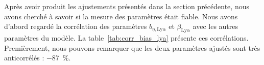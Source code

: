 Après avoir produit les ajustements présentés dans la section précédente, nous avons cherché à savoir si la mesure des paramètres \lya{} était fiable. Nous avons d'abord regardé la corrélation des paramètres $b_{\eta,\mathrm{Ly}\alpha}$ et $\beta_{\mathrm{Ly}\alpha}$ avec les autres paramètres du modèle. La table~\ref{tab:corr_bias_lya} présente ces corrélations.
Premièrement, nous pouvons remarquer que les deux paramètres \lya{} ajustés sont très anticorrélés : \SI{-87}{\percent}.
